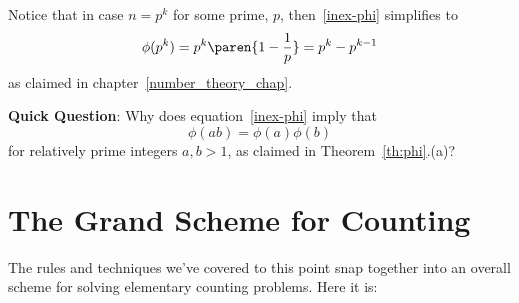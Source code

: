Notice that in case $n = p^k$ for some prime, $p$, then~\eqref{inex-phi}
simplifies to
\[
\phi(p^k) = p^k\paren{1-\frac{1}{p}} = p^k - p^{k-1}
\]
as claimed in chapter~\ref{number_theory_chap}.

\textbf{Quick Question}:  Why does equation~\eqref{inex-phi} 
imply that
\[
\phi(ab) = \phi(a)\phi(b)
\]
for relatively prime integers $a,b>1$, as claimed in
Theorem~\ref{th:phi}.(a)?

\begin{problems}
\practiceproblems
{}

\classproblems
{}

\homeworkproblems
{}

\end{problems}

\iffalse


\section{The Grand Scheme for Counting}

The rules and techniques we've covered to this point snap together
into an overall scheme for solving elementary counting problems.  Here
it is:


